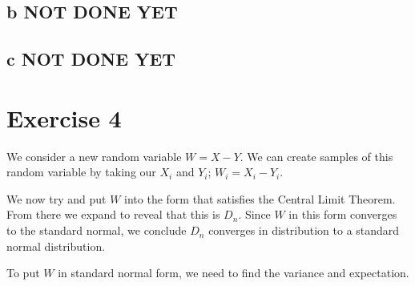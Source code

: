 \documentclass{article}
\begin{document}
\subsection{b NOT DONE YET}

\subsection{c NOT DONE YET}

\section{Exercise 4}
We consider a new random variable $W = X - Y$. We can create samples of this
random variable by taking our $X_i$ and $Y_i$; $W_i = X_i - Y_i$.

We now try and put $W$ into the form that satisfies the Central Limit Theorem.
From there we expand to reveal that this is $D_n$. Since $W$ in this form
converges to the standard normal, we conclude $D_n$ converges in distribution
to a standard normal distribution.

To put $W$ in standard normal form, we need to find the variance and expectation.
\begin{align*}

\end{align*}
\end{document}
